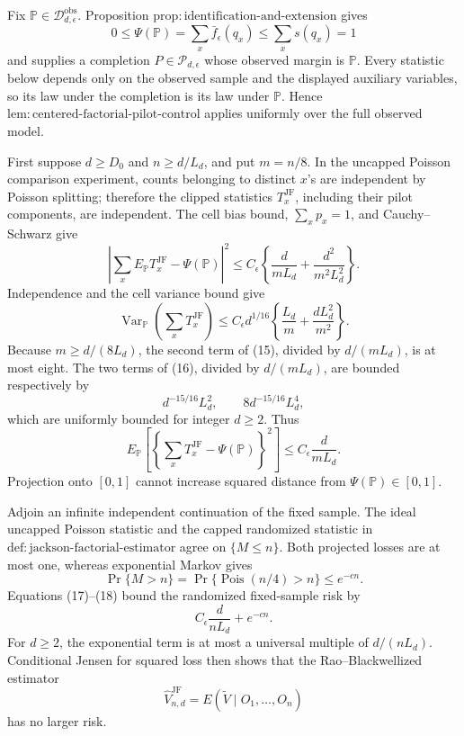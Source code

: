 Fix \(\mathbb P\in\mathcal D_{d,\epsilon}^{\mathrm{obs}}\).  Proposition \(\mathrm{prop:identification\mbox{-}and\mbox{-}extension}\) gives
\[
 0\leq\Psi(\mathbb P)=\sum_x\bar f_\epsilon(q_x)
 \leq\sum_xs(q_x)=1
\]
and supplies a completion \(P\in\mathcal P_{d,\epsilon}\) whose observed margin is \(\mathbb P\).  Every statistic below depends only on the observed sample and the displayed auxiliary variables, so its law under the completion is its law under \(\mathbb P\).  Hence \(\mathrm{lem:centered\mbox{-}factorial\mbox{-}pilot\mbox{-}control}\) applies uniformly over the full observed model.

First suppose \(d\geq D_0\) and \(n\geq d/L_d\), and put \(m=n/8\).  In the uncapped Poisson comparison experiment, counts belonging to distinct \(x\)'s are independent by Poisson splitting; therefore the clipped statistics \(T_x^{\mathrm{JF}}\), including their pilot components, are independent.  The cell bias bound, \(\sum_xp_x=1\), and Cauchy--Schwarz give
\[
 \left|\sum_xE_{\mathbb P}T_x^{\mathrm{JF}}-\Psi(\mathbb P)\right|^2
 \leq C_\epsilon\left\{
 \frac d{mL_d}+\frac{d^2}{m^2L_d^2}\right\}.                     \tag{15}
\]
Independence and the cell variance bound give
\[
 \operatorname{Var}_{\mathbb P}\left(\sum_xT_x^{\mathrm{JF}}\right)
 \leq C_\epsilon d^{1/16}
 \left\{\frac{L_d}{m}+\frac{dL_d^2}{m^2}\right\}.               \tag{16}
\]
Because \(m\geq d/(8L_d)\), the second term of (15), divided by \(d/(mL_d)\), is at most eight.  The two terms of (16), divided by \(d/(mL_d)\), are bounded respectively by
\[
 d^{-15/16}L_d^2,
 \qquad 8d^{-15/16}L_d^4,
\]
which are uniformly bounded for integer \(d\geq2\).  Thus
\[
 E_{\mathbb P}\left[
 \left\{\sum_xT_x^{\mathrm{JF}}-\Psi(\mathbb P)\right\}^2\right]
 \leq C_\epsilon\frac d{mL_d}.                                    \tag{17}
\]
Projection onto \([0,1]\) cannot increase squared distance from \(\Psi(\mathbb P)\in[0,1]\).

Adjoin an infinite independent continuation of the fixed sample.  The ideal uncapped Poisson statistic and the capped randomized statistic in \(\mathrm{def:jackson\mbox{-}factorial\mbox{-}estimator}\) agree on \(\{M\leq n\}\).  Both projected losses are at most one, whereas exponential Markov gives
\[
 \Pr\{M>n\}=\Pr\{\operatorname{Pois}(n/4)>n\}\leq e^{-cn}.       \tag{18}
\]
Equations (17)--(18) bound the randomized fixed-sample risk by
\[
 C_\epsilon\frac d{nL_d}+e^{-cn}.
\]
For \(d\geq2\), the exponential term is at most a universal multiple of \(d/(nL_d)\).  Conditional Jensen for squared loss then shows that the Rao--Blackwellized estimator
\[
 \widehat V_{n,d}^{\mathrm{JF}}=E(\widetilde V\mid O_1,\ldots,O_n)
\]
has no larger risk.

